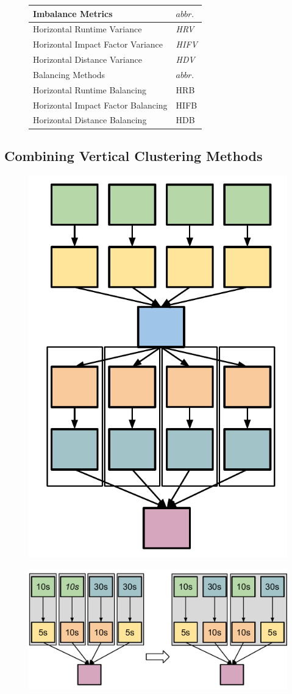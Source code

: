 \begin{figure}[htb]
	\centering
	\small
	\begin{tabular}{l|l}
		\hline
		Imbalance Metrics & $abbr.$   \\
		\hline
		Horizontal Runtime Variance & \emph{HRV}   \\ 
		Horizontal Impact Factor Variance & \emph{HIFV} \\ 
		Horizontal Distance Variance & \emph{HDV}  \\ 
		\hline
		Balancing Methods & $abbr.$  \\
		\hline
		Horizontal Runtime Balancing & HRB   \\ 
		Horizontal Impact Factor Balancing & HIFB\\ 
		Horizontal Distance Balancing & HDB \\ 
		\hline
	\end{tabular}
	\label{tab:2}
\end{figure}
\subsection{Combining Vertical Clustering Methods}
\label{sec:vertical}
\begin{figure}[htb]
	\centering
	\includegraphics[width=0.35\linewidth]{figures/imbalance/vertical_clustering.pdf}
	\label{fig:imbalance_vc}
\end{figure}


\begin{figure}[htb]
	\centering
	\includegraphics[width=0.35\linewidth]{figures/imbalance/vertical_clustering_prior.pdf}
	\label{fig:imbalance_vc_prior}
\end{figure}

